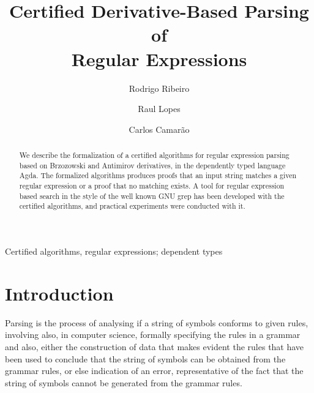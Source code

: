 \documentclass[review]{elsarticle}
\begin{document}
\begin{frontmatter}

\title{Certified Derivative-Based Parsing of\\ Regular Expressions}

\author[rgr]{Rodrigo Ribeiro}
\address[rgr]{Dep. de Computa\c{c}\~ao e Sistemas, Universidade
  Federal de Ouro Preto, ICEA, Jo\~ao Monlevade, Minas Gerais, Brasil}

\author{Raul Lopes}
\address{Dep. de Computa\c{c}\~ao, Universidade
  Federal de Ouro Preto, ICEB, Campus Universit\'ario Morro do
  Cruzeiro, Ouro Preto, Minas Gerais, Brasil}


\author{Carlos Camar\~ao}
\address{Dep. de Ci\^encia da Computa\c{c}\~ao, Universidade Federal
  de Minas Gerais, Av. Ant\^onio Carlos 6627, Belo Horizonte, Minas Gerais, Brasil}


\begin{abstract}

We describe the formalization of a certified algorithms for regular
expression parsing based on Brzozowski and Antimirov derivatives,
in the dependently typed language Agda. The formalized algorithms
produces proofs that an input string matches a given regular expression
or a proof that no matching exists. A tool for regular expression based
search in the style of the well known GNU grep has been developed with
the certified algorithms, and practical experiments were conducted
with it.

\end{abstract}

\begin{keyword}
Certified algorithms, regular expressions; dependent types
\end{keyword}

\end{frontmatter}


\section{Introduction}\label{sec:intro}

Parsing is the process of analysing if a string of symbols conforms to
given rules, involving also, in computer science, formally specifying
the rules in a grammar and also, either the construction of data that
makes evident the rules that have been used to conclude that the
string of symbols can be obtained from the grammar rules, or else
indication of an error, representative of the fact that the string of
symbols cannot be generated from the grammar rules.
\end{document}
